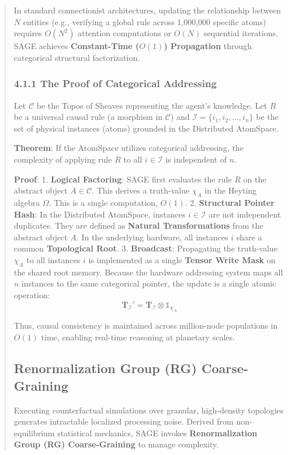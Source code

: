 \documentclass[10pt,twocolumn,letterpaper]{article}
\begin{document}
\begin{abstract}
In standard connectionist architectures, updating the relationship between $N$ entities (e.g., verifying a global rule across 1,000,000 specific atoms) requires $O(N^2)$ attention computations or $O(N)$ sequential iterations. SAGE achieves \textbf{Constant-Time ($O(1)$) Propagation} through categorical structural factorization.

\subsubsection{4.1.1 The Proof of Categorical Addressing}
Let $\mathcal{C}$ be the Topos of Sheaves representing the agent's knowledge. Let $R$ be a universal causal rule (a morphism in $\mathcal{C}$) and $\mathcal{I} = \{i_1, i_2, \dots, i_n\}$ be the set of physical instances (atoms) grounded in the Distributed AtomSpace.

\textbf{Theorem}: If the AtomSpace utilizes categorical addressing, the complexity of applying rule $R$ to all $i \in \mathcal{I}$ is independent of $n$.

\textbf{Proof}:
1.  \textbf{Logical Factoring}: SAGE first evaluates the rule $R$ on the abstract object $A \in \mathcal{C}$. This derives a truth-value $\chi_A$ in the Heyting algebra $\Omega$. This is a single computation, $O(1)$.
2.  \textbf{Structural Pointer Hash}: In the Distributed AtomSpace, instances $i \in \mathcal{I}$ are not independent duplicates. They are defined as \textbf{Natural Transformations} from the abstract object $A$. In the underlying hardware, all instances $i$ share a common \textbf{Topological Root}.
3.  \textbf{Broadcast}: Propagating the truth-value $\chi_A$ to all instances $i$ is implemented as a single \textbf{Tensor Write Mask} on the shared root memory. Because the hardware addressing system maps all $n$ instances to the same categorical pointer, the update is a single atomic operation:
    $$ \mathbf{T}_{\mathcal{I}}' = \mathbf{T}_{\mathcal{I}} \otimes \mathbb{1}_{\chi_A} $$

Thus, causal consistency is maintained across million-node populations in \textbf{$O(1)$} time, enabling real-time reasoning at planetary scales.

\subsection{Renormalization Group (RG) Coarse-Graining}

Executing counterfactual simulations over granular, high-density topologies generates intractable localized processing noise. Derived from non-equilibrium statistical mechanics, SAGE invokes \textbf{Renormalization Group (RG) Coarse-Graining} to manage complexity.


\end{abstract}
\end{document}
